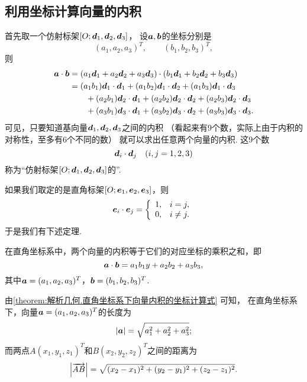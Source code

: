 \subsection{利用坐标计算向量的内积}
首先取一个仿射标架\([O;\boldsymbol{d}_1,\boldsymbol{d}_2,\boldsymbol{d}_3]\)，
设\(\boldsymbol{a},\boldsymbol{b}\)的坐标分别是\[
	(a_1,a_2,a_3)^T, \qquad
	(b_1,b_2,b_3)^T,
\]
则\begin{equation}
	\begin{split}
	\boldsymbol{a}\cdot\boldsymbol{b}
	&= (a_1 \boldsymbol{d}_1 + a_2 \boldsymbol{d}_2 + a_3 \boldsymbol{d}_3)
	\cdot (b_1 \boldsymbol{d}_1 + b_2 \boldsymbol{d}_2 + b_3 \boldsymbol{d}_3) \\
	&= (a_1 b_1) \boldsymbol{d}_1 \cdot \boldsymbol{d}_1
	+ (a_1 b_2) \boldsymbol{d}_1 \cdot \boldsymbol{d}_2
	+ (a_1 b_3) \boldsymbol{d}_1 \cdot \boldsymbol{d}_3 \\
	&\hspace{20pt}
	+ (a_2 b_1) \boldsymbol{d}_2 \cdot \boldsymbol{d}_1
	+ (a_2 b_2) \boldsymbol{d}_2 \cdot \boldsymbol{d}_2
	+ (a_2 b_3) \boldsymbol{d}_2 \cdot \boldsymbol{d}_3 \\
	&\hspace{20pt}
	+ (a_3 b_1) \boldsymbol{d}_3 \cdot \boldsymbol{d}_1
	+ (a_3 b_2) \boldsymbol{d}_3 \cdot \boldsymbol{d}_2
	+ (a_3 b_3) \boldsymbol{d}_3 \cdot \boldsymbol{d}_3.
	\end{split}
\end{equation}
可见，只要知道基向量\(\boldsymbol{d}_1,\boldsymbol{d}_2,\boldsymbol{d}_3\)之间的内积
（看起来有9个数，实际上由于内积的对称性，至多有6个不同的数）
就可以求出任意两个向量的内积.
这9个数\[
	\boldsymbol{d}_i \cdot \boldsymbol{d}_j
	\quad(i,j=1,2,3)
\]称为“仿射标架\([O;\boldsymbol{d}_1,\boldsymbol{d}_2,\boldsymbol{d}_3]\)的”.

如果我们取定的是直角标架\([O;\boldsymbol{e}_1,\boldsymbol{e}_2,\boldsymbol{e}_3]\)，则\[
	\boldsymbol{e}_i \cdot \boldsymbol{e}_j = \left\{ \begin{array}{ll}
		1, & i = j, \\
		0, & i \neq j.
	\end{array} \right.
\]
于是我们有下述定理.
\begin{theorem}\label{theorem:解析几何.直角坐标系下向量内积的坐标计算式}
在直角坐标系中，两个向量的内积等于它们的对应坐标的乘积之和，即
\begin{equation}
	\boldsymbol{a}\cdot\boldsymbol{b}
	= a_1 b_1 y + a_2 b_2 + a_3 b_3,
\end{equation}
其中\(\boldsymbol{a}=(a_1,a_2,a_3)^T\)，\(\boldsymbol{b}=(b_1,b_2,b_3)^T\).
\end{theorem}

由\cref{theorem:解析几何.直角坐标系下向量内积的坐标计算式} 可知，
在直角坐标系下，向量\(\boldsymbol{a}=(a_1,a_2,a_3)^T\)的长度为\begin{equation}
	\abs{\boldsymbol{a}} = \sqrt{a_1^2+a_2^2+a_3^2};
\end{equation}
而两点\(A(x_1,y_1,z_1)^T\)和\(B(x_2,y_2,z_2)^T\)之间的距离为\begin{equation}
	\abs{\overrightarrow{AB}} = \sqrt{(x_2-x_1)^2+(y_2-y_1)^2+(z_2-z_1)^2}.
\end{equation}

